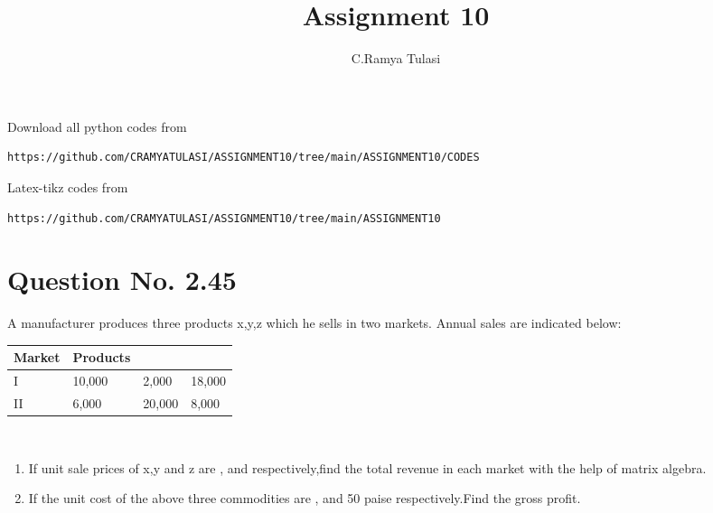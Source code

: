 \documentclass[journal,12pt,twocolumn]{IEEEtran}
\begin{document}
     \def\rightbox#1{\makebox[0in][r]{#1}}
     \def\centbox#1{\makebox[0in]{#1}}
     \def\topbox#1{\raisebox{-\baselineskip}[0in][0in]{#1}}
     \def\midbox#1{\raisebox{-0.5\baselineskip}[0in][0in]{#1}}
\vspace{3cm}
\title{Assignment 10}
\author{C.Ramya Tulasi}
\maketitle
\newpage
\bigskip
\renewcommand{\thefigure}{\theenumi}
\renewcommand{\thetable}{\theenumi}
Download all python codes from 
\begin{lstlisting}
https://github.com/CRAMYATULASI/ASSIGNMENT10/tree/main/ASSIGNMENT10/CODES
\end{lstlisting}
%
Latex-tikz codes from 
%
\begin{lstlisting}
https://github.com/CRAMYATULASI/ASSIGNMENT10/tree/main/ASSIGNMENT10
\end{lstlisting}
%
\section{Question No. 2.45}

A manufacturer produces three products x,y,z which he sells in two markets. Annual sales are indicated below:
\\
\begin{table}[!ht]
\begin{center}
\begin{tabular}{ | m{2cm} | m{1.5cm}| m{2cm} | m{1.5cm} |} 
\hline
Market & Products\\
\hline
I &10,000 &2,000 &18,000\\
\hline
II &6,000 &20,000 &8,000\\
\hline
\end{tabular}
\end{center}
\end{table}
\\
\begin{enumerate}
\item If unit sale prices of x,y and z are , and  respectively,find the total revenue in each market with the help of matrix algebra.
\item If the unit cost of the above three commodities are , and 50 paise respectively.Find the gross profit.
\end{enumerate}
\end{document}

